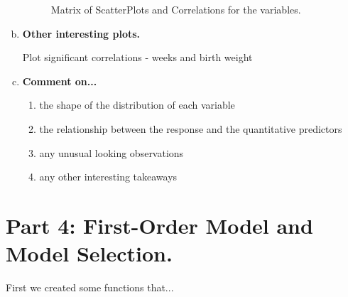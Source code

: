 \documentclass{article}\usepackage[]{graphicx}\usepackage[]{xcolor}
\makeatletter
\newenvironment{kframe}{%
 \def\at@end@of@kframe{}%
 \ifinner\ifhmode%
  \def\at@end@of@kframe{\end{minipage}}%
  \begin{minipage}{\columnwidth}%
 \fi\fi%
 \def\FrameCommand##1{\hskip\@totalleftmargin \hskip-\fboxsep
 \colorbox{shadecolor}{##1}\hskip-\fboxsep
     \hskip-\linewidth \hskip-\@totalleftmargin \hskip\columnwidth}%
 \MakeFramed {\advance\hsize-\width
   \@totalleftmargin\z@ \linewidth\hsize
   \@setminipage}}%
 {\par\unskip\endMakeFramed%
 \at@end@of@kframe}
\newenvironment{knitrout}{}{} %
\makeatother
\begin{document}
\begin{enumerate}[a.]
\begin{figure}[H]
\centering
\begin{knitrout}
\color{fgcolor}\begin{kframe}


{\ttfamily\noindent\bfseries\color{errorcolor}{\#\# Error in data.frame(plotType = plotType, xVar = xVar, yVar = yVar, posX = posX, : arguments imply differing number of rows: 0, 1}}

{\ttfamily\noindent\bfseries\color{errorcolor}{\#\# Error in eval(expr, envir, enclos): object 'correlationsmatrix' not found}}\end{kframe}
\end{knitrout}
\caption{Matrix of ScatterPlots and Correlations for the variables.}
\label{CorrelationSummary}
\end{figure}

\item\textbf{Other interesting plots.}

Plot significant correlations 
- weeks and birth weight

\item\textbf{Comment on...}
\begin{enumerate}[]
\item{the shape of the distribution of each variable}
\item{the relationship between the response and the quantitative predictors}
\item{any unusual looking observations}
\item{any other interesting takeaways}
\end{enumerate}
\end{enumerate}

\section{Part 4: First-Order Model and Model Selection.}

First we created some functions that...
\end{document}

